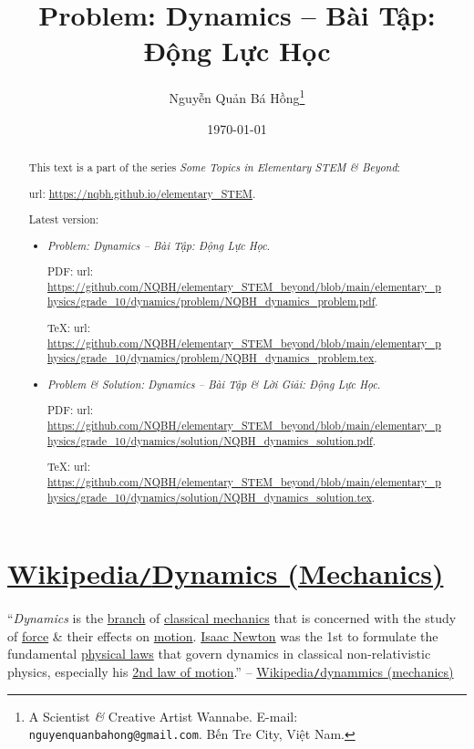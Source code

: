 \documentclass{article}
\title{Problem: Dynamics -- Bài Tập: Động Lực Học}
\author{Nguyễn Quản Bá Hồng\footnote{A Scientist {\it\&} Creative Artist Wannabe. E-mail: {\tt nguyenquanbahong@gmail.com}. Bến Tre City, Việt Nam.}}
\date{\today}
\begin{document}
\maketitle
\begin{abstract}
	This text is a part of the series {\it Some Topics in Elementary STEM \& Beyond}:
	
	{\sc url}: \url{https://nqbh.github.io/elementary_STEM}.
	
	Latest version:
	\begin{itemize}
		\item {\it Problem: Dynamics -- Bài Tập: Động Lực Học}.
		
		PDF: {\sc url}: \url{https://github.com/NQBH/elementary_STEM_beyond/blob/main/elementary_physics/grade_10/dynamics/problem/NQBH_dynamics_problem.pdf}.
		
		\TeX: {\sc url}: \url{https://github.com/NQBH/elementary_STEM_beyond/blob/main/elementary_physics/grade_10/dynamics/problem/NQBH_dynamics_problem.tex}.
		\item {\it Problem \& Solution: Dynamics -- Bài Tập \& Lời Giải: Động Lực Học}.
		
		PDF: {\sc url}: \url{https://github.com/NQBH/elementary_STEM_beyond/blob/main/elementary_physics/grade_10/dynamics/solution/NQBH_dynamics_solution.pdf}.
		
		\TeX: {\sc url}: \url{https://github.com/NQBH/elementary_STEM_beyond/blob/main/elementary_physics/grade_10/dynamics/solution/NQBH_dynamics_solution.tex}.
	\end{itemize}
\end{abstract}
\tableofcontents


\section{\href{https://en.wikipedia.org/wiki/Dynamics_(mechanics)}{Wikipedia\texttt{/}Dynamics (Mechanics)}}
``{\it Dynamics} is the \href{https://en.wikipedia.org/wiki/Branch_(academia)#Physics}{branch} of \href{https://en.wikipedia.org/wiki/Classical_mechanics}{classical mechanics} that is concerned with the study of \href{https://en.wikipedia.org/wiki/Force_(physics)}{force} \& their effects on \href{https://en.wikipedia.org/wiki/Motion_(physics)}{motion}. \href{https://en.wikipedia.org/wiki/Isaac_Newton}{Isaac Newton} was the 1st to formulate the fundamental \href{https://en.wikipedia.org/wiki/Physical_law}{physical laws} that govern dynamics in classical non-relativistic physics, especially his \href{https://en.wikipedia.org/wiki/Second_law_of_motion}{2nd law of motion}.'' -- \href{https://en.wikipedia.org/wiki/Dynamics_(mechanics)}{Wikipedia\texttt{/}dynammics (mechanics)}
\end{document}
